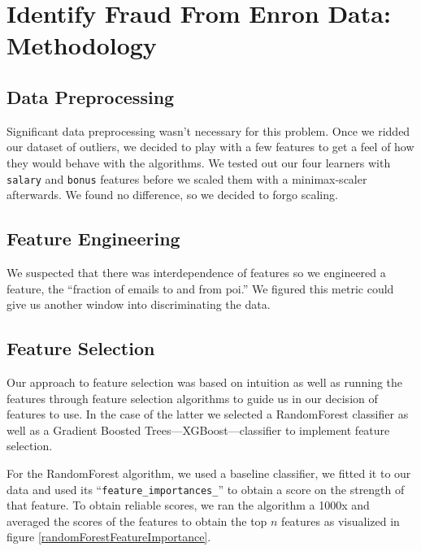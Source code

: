 \documentclass[twoside,openright,titlepage,numbers=noenddot,headinclude,%
               footinclude=true,cleardoublepage=empty,abstractoff,BCOR=5mm,%
               paper=a4,fontsize=11pt,ngerman,american]{scrreprt}
\numberwithin{theorem}{chapter}
\numberwithin{definition}{chapter}
\numberwithin{algorithm}{chapter}
\numberwithin{figure}{chapter}
\numberwithin{table}{chapter}
\numberwithin{equation}{chapter}
\begin{document}
\chapter*{Identify Fraud From Enron Data: Methodology}

\section*{Data Preprocessing}
Significant data preprocessing wasn't necessary for this problem. Once we ridded our dataset of outliers, we decided to play with a few features to get a feel of how they would behave with the algorithms. We tested out our four learners with \texttt{salary} and \texttt{bonus} features before we scaled them with a minimax-scaler afterwards. We found no difference, so we decided to forgo scaling.

\section*{Feature Engineering}
We suspected that there was interdependence of features so we engineered a feature, the ``fraction of emails to and from poi.'' We figured this metric could give us another window into discriminating the data. 

\section*{Feature Selection}
Our approach to feature selection was based on intuition as well as running the features through feature selection algorithms to guide us in our decision of features to use. In the case of the latter we selected a RandomForest classifier as well as a Gradient Boosted Trees---XGBoost---classifier to implement feature selection.

For the RandomForest algorithm, we used a baseline classifier, we fitted it to our data and used its ``\texttt{feature\_importances\_}'' to obtain a score on the strength of that feature. To obtain reliable scores, we ran the algorithm a 1000x and averaged the scores of the features to obtain the top $n$ features as visualized in figure \ref{randomForestFeatureImportance}.
\end{document}
